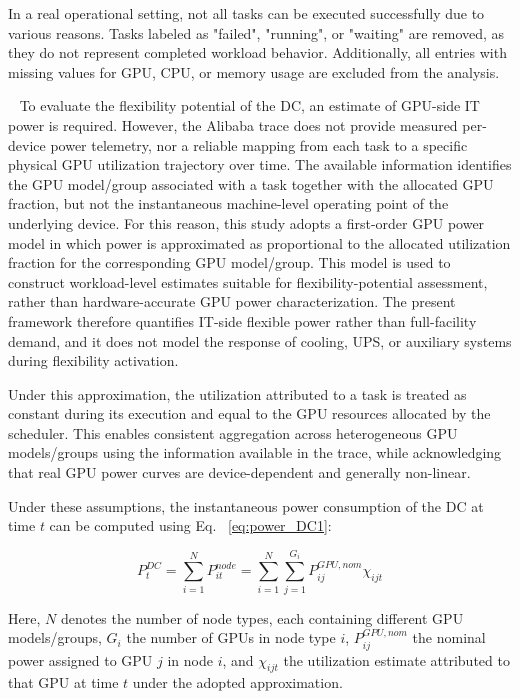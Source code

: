 \documentclass[preprint,12pt]{elsarticle}
\begin{document}
In a real operational setting, not all tasks can be executed successfully due to various reasons.  Tasks labeled as "failed", "running", or "waiting" are removed, as they do not represent completed workload behavior. Additionally, all entries with missing values for GPU, CPU, or memory usage are excluded from the analysis. 


\
To evaluate the flexibility potential of the DC, an estimate of GPU-side IT power is required. However, the Alibaba trace does not provide measured per-device power telemetry, nor a reliable mapping from each task to a specific physical GPU utilization trajectory over time. The available information identifies the GPU model/group associated with a task together with the allocated GPU fraction, but not the instantaneous machine-level operating point of the underlying device. For this reason, this study adopts a first-order GPU power model in which power is approximated as proportional to the allocated utilization fraction for the corresponding GPU model/group. This model is used to construct workload-level estimates suitable for flexibility-potential assessment, rather than hardware-accurate GPU power characterization. The present framework therefore quantifies IT-side flexible power rather than full-facility demand, and it does not model the response of cooling, UPS, or auxiliary systems during flexibility activation.

Under this approximation, the utilization attributed to a task is treated as constant during its execution and equal to the GPU resources allocated by the scheduler. This enables consistent aggregation across heterogeneous GPU models/groups using the information available in the trace, while acknowledging that real GPU power curves are device-dependent and generally non-linear.

Under these assumptions, the instantaneous power consumption of the DC at time $t$ can be computed using Eq. ~\ref{eq:power_DC1}:

\begin{equation} \label{eq:power_DC1}
P^{DC}_{t} = \sum_{i=1}^{N} P^{node}_{it} = \sum_{i=1}^{N} \sum_{j=1}^{G_i} P^{GPU, nom}_{ij} \chi_{ijt}
\end{equation}

Here, $N$ denotes the number of node types, each containing different GPU models/groups, $G_i$ the number of GPUs in node type $i$, $P^{GPU, nom}_{ij}$ the nominal power assigned to GPU $j$ in node $i$, and $\chi_{ijt}$ the utilization estimate attributed to that GPU at time $t$ under the adopted approximation. 
\end{document}
